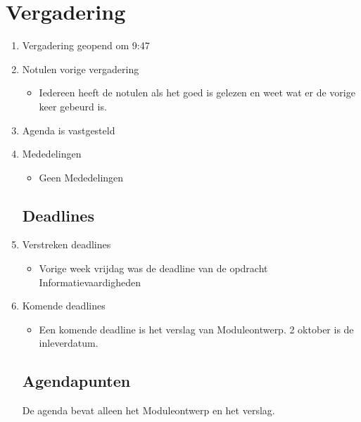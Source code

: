 \documentclass{article}
\begin{document}
\section*{Vergadering}
\begin{enumerate}
	
	\subsection*{Vooraf}
	\item Vergadering geopend om 9:47%
	\item Notulen vorige vergadering
	\begin{itemize}
		\item Iedereen heeft de notulen als het goed is gelezen en weet wat er de vorige keer gebeurd is.
	\end{itemize}
	\item Agenda is vastgesteld
	\item Mededelingen
	\begin{itemize}
		\item Geen Mededelingen
	\end{itemize}

	\subsection*{Deadlines}
	\item Verstreken deadlines
	\begin{itemize}
		\item Vorige week vrijdag was de deadline van de opdracht Informatievaardigheden
	\end{itemize}
	\item Komende deadlines
	\begin{itemize}
		\item Een komende deadline is het verslag van Moduleontwerp. 2 oktober is de inleverdatum.
	\end{itemize}

	\subsection*{Agendapunten}
De agenda bevat alleen het Moduleontwerp en het verslag.
	


\end{enumerate}
\end{document}
